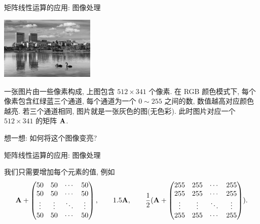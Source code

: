 \begin{frame}{矩阵线性运算的应用: 图像处理}
	\onslide<+->
	\begin{center}
		\includegraphics[height=3cm]{../image/matrix2.jpg}
	\end{center}

	一张图片由一些像素构成, 上图包含 $512\times341$ 个像素.
	\onslide<+->
	在 RGB 颜色模式下, 每个像素包含红绿蓝三个通道, 每个通道为一个 $0\sim255$ 之间的数, 数值越高对应颜色越亮.
	\onslide<+->
	若三个通道相同, 图片就是一张灰色的图(无色彩).
	此时图片对应一个 $512\times 341$ 的矩阵 ${\mathbf{A}}$.

	\onslide<+->
	想一想: 如何将这个图像变亮?
\end{frame}


\begin{frame}{矩阵线性运算的应用: 图像处理}
	\onslide<+->
	\begin{center}
	\end{center}

	\onslide<+->
	我们只需要增加每个元素的值, 例如
	\[{\mathbf{A}}+\begin{pmatrix}
		50&50&\cdots&50\\
		50&50&\cdots&50\\
		\vdots&\vdots&\ddots&\vdots\\
		50&50&\cdots&50
	\end{pmatrix},\qquad
	1.5{\mathbf{A}},\qquad\frac12({\mathbf{A}}+\begin{pmatrix}
		255&255&\cdots&255\\
		255&255&\cdots&255\\
		\vdots&\vdots&\ddots&\vdots\\
		255&255&\cdots&255
	\end{pmatrix}).\]
\end{frame}


